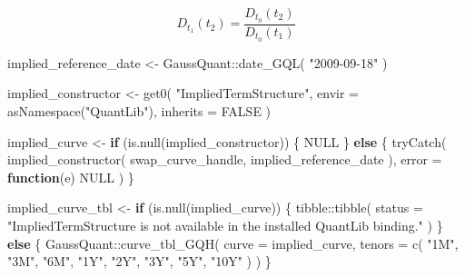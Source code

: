 \documentclass[
  letterpaper,
  DIV=11,
  numbers=noendperiod]{scrreprt}
\newenvironment{Shaded}{\begin{snugshade}}{\end{snugshade}}
\newcommand{\AttributeTok}[1]{\textcolor[rgb]{0.40,0.45,0.13}{#1}}
\newcommand{\ConstantTok}[1]{\textcolor[rgb]{0.56,0.35,0.01}{#1}}
\newcommand{\ControlFlowTok}[1]{\textcolor[rgb]{0.00,0.23,0.31}{\textbf{#1}}}
\newcommand{\FunctionTok}[1]{\textcolor[rgb]{0.28,0.35,0.67}{#1}}
\newcommand{\NormalTok}[1]{\textcolor[rgb]{0.00,0.23,0.31}{#1}}
\newcommand{\OtherTok}[1]{\textcolor[rgb]{0.00,0.23,0.31}{#1}}
\newcommand{\SpecialCharTok}[1]{\textcolor[rgb]{0.37,0.37,0.37}{#1}}
\newcommand{\StringTok}[1]{\textcolor[rgb]{0.13,0.47,0.30}{#1}}
\begin{document}
\[
D_{t_1}(t_2)
=
\frac{
D_{t_0}(t_2)
}{
D_{t_0}(t_1)
}
\]

\begin{Shaded}
\begin{Highlighting}[]
\NormalTok{implied\_reference\_date }\OtherTok{\textless{}{-}}\NormalTok{ GaussQuant}\SpecialCharTok{::}\FunctionTok{date\_GQL}\NormalTok{(}
  \StringTok{"2009{-}09{-}18"}
\NormalTok{)}

\NormalTok{implied\_constructor }\OtherTok{\textless{}{-}} \FunctionTok{get0}\NormalTok{(}
  \StringTok{"ImpliedTermStructure"}\NormalTok{,}
  \AttributeTok{envir =} \FunctionTok{asNamespace}\NormalTok{(}\StringTok{"QuantLib"}\NormalTok{),}
  \AttributeTok{inherits =} \ConstantTok{FALSE}
\NormalTok{)}

\NormalTok{implied\_curve }\OtherTok{\textless{}{-}} \ControlFlowTok{if}\NormalTok{ (}\FunctionTok{is.null}\NormalTok{(implied\_constructor)) \{}
  \ConstantTok{NULL}
\NormalTok{\} }\ControlFlowTok{else}\NormalTok{ \{}
  \FunctionTok{tryCatch}\NormalTok{(}
    \FunctionTok{implied\_constructor}\NormalTok{(}
\NormalTok{      swap\_curve\_handle,}
\NormalTok{      implied\_reference\_date}
\NormalTok{    ),}
    \AttributeTok{error =} \ControlFlowTok{function}\NormalTok{(e) }\ConstantTok{NULL}
\NormalTok{  )}
\NormalTok{\}}

\NormalTok{implied\_curve\_tbl }\OtherTok{\textless{}{-}} \ControlFlowTok{if}\NormalTok{ (}\FunctionTok{is.null}\NormalTok{(implied\_curve)) \{}
\NormalTok{  tibble}\SpecialCharTok{::}\FunctionTok{tibble}\NormalTok{(}
    \AttributeTok{status =} \StringTok{"ImpliedTermStructure is not available in the installed QuantLib binding."}
\NormalTok{  )}
\NormalTok{\} }\ControlFlowTok{else}\NormalTok{ \{}
\NormalTok{  GaussQuant}\SpecialCharTok{::}\FunctionTok{curve\_tbl\_GQH}\NormalTok{(}
    \AttributeTok{curve =}\NormalTok{ implied\_curve,}
    \AttributeTok{tenors =} \FunctionTok{c}\NormalTok{(}
      \StringTok{"1M"}\NormalTok{, }\StringTok{"3M"}\NormalTok{, }\StringTok{"6M"}\NormalTok{, }\StringTok{"1Y"}\NormalTok{,}
      \StringTok{"2Y"}\NormalTok{, }\StringTok{"3Y"}\NormalTok{, }\StringTok{"5Y"}\NormalTok{, }\StringTok{"10Y"}
\NormalTok{    )}
\NormalTok{  )}
\NormalTok{\}}


\end{Highlighting}
\end{Shaded}
\end{document}
